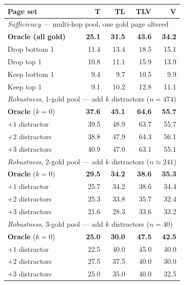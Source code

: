 \begin{table}[t]
\centering
\small
\setlength{\tabcolsep}{4pt}
\begin{tabular}{lrrrr}
\toprule
\textbf{Page set} & \textbf{T} & \textbf{TL} & \textbf{TLV} & \textbf{V} \\
\midrule
\multicolumn{5}{l}{\emph{Sufficiency} — multi-hop pool, one gold page altered} \\
  \quad \textbf{Oracle (all gold)} & \textbf{25.1} & \textbf{31.5} & \textbf{43.6} & \textbf{34.2} \\
  \quad Drop bottom 1 & 11.4 & 13.4 & 18.5 & 15.1 \\
  \quad Drop top 1    & 10.8 & 11.1 & 15.9 & 13.9 \\
  \quad Keep bottom 1 &  9.4 &  9.7 & 10.5 &  9.9 \\
  \quad Keep top 1    &  9.1 & 10.2 & 12.8 & 11.1 \\
\cmidrule(lr){1-5}
\multicolumn{5}{l}{\emph{Robustness}, 1-gold pool — add $k$ distractors ($n{=}474$)} \\
  \quad \textbf{Oracle} ($k{=}0$) & \textbf{37.6} & \textbf{45.1} & \textbf{64.6} & \textbf{55.7} \\
  \quad $+1$ distractor  & 39.5 & 48.9 & 63.7 & 55.7 \\
  \quad $+2$ distractors & 38.8 & 47.9 & 64.3 & 56.1 \\
  \quad $+3$ distractors & 40.9 & 47.0 & 63.1 & 55.1 \\
\cmidrule(lr){1-5}
\multicolumn{5}{l}{\emph{Robustness}, 2-gold pool — add $k$ distractors ($n{\approx}241$)} \\
  \quad \textbf{Oracle} ($k{=}0$) & \textbf{29.5} & \textbf{34.2} & \textbf{38.6} & \textbf{35.3} \\
  \quad $+1$ distractor  & 25.7 & 34.2 & 38.6 & 34.4 \\
  \quad $+2$ distractors & 25.3 & 33.8 & 35.7 & 32.4 \\
  \quad $+3$ distractors & 21.6 & 28.3 & 33.6 & 33.2 \\
\cmidrule(lr){1-5}
\multicolumn{5}{l}{\emph{Robustness}, 3-gold pool — add $k$ distractors ($n{=}40$)} \\
  \quad \textbf{Oracle} ($k{=}0$) & \textbf{25.0} & \textbf{30.0} & \textbf{47.5} & \textbf{42.5} \\
  \quad $+1$ distractor  & 22.5 & 40.0 & 45.0 & 40.0 \\
  \quad $+2$ distractors & 27.5 & 37.5 & 40.0 & 30.0 \\
  \quad $+3$ distractors & 25.0 & 35.0 & 40.0 & 32.5 \\
\bottomrule
\end{tabular}


\end{table}
